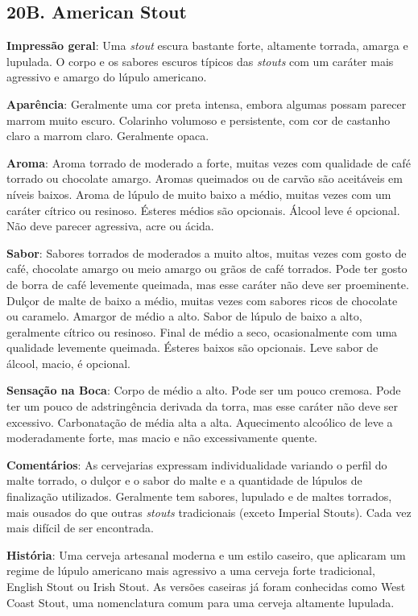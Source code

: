 \subsection*{20B. American Stout}

\textbf{Impressão geral}: Uma \textit{stout} escura bastante forte, altamente torrada, amarga e lupulada. O corpo e os sabores escuros típicos das \textit{stouts} com um caráter mais agressivo e amargo do lúpulo americano.

\textbf{Aparência}: Geralmente uma cor preta intensa, embora algumas possam parecer marrom muito escuro. Colarinho volumoso e persistente, com cor de castanho claro a marrom claro. Geralmente opaca.

\textbf{Aroma}: Aroma torrado de moderado a forte, muitas vezes com qualidade de café torrado ou chocolate amargo. Aromas queimados ou de carvão são aceitáveis em níveis baixos. Aroma de lúpulo de muito baixo a médio, muitas vezes com um caráter cítrico ou resinoso. Ésteres médios são opcionais. Álcool leve é opcional. Não deve parecer agressiva, acre ou ácida.

\textbf{Sabor}: Sabores torrados de moderados a muito altos, muitas vezes com gosto de café, chocolate amargo ou meio amargo ou grãos de café torrados. Pode ter gosto de borra de café levemente queimada, mas esse caráter não deve ser proeminente. Dulçor de malte de baixo a médio, muitas vezes com sabores ricos de chocolate ou caramelo. Amargor de médio a alto. Sabor de lúpulo de baixo a alto, geralmente cítrico ou resinoso. Final de médio a seco, ocasionalmente com uma qualidade levemente queimada. Ésteres baixos são opcionais. Leve sabor de álcool, macio, é opcional.

\textbf{Sensação na Boca}: Corpo de médio a alto. Pode ser um pouco cremosa. Pode ter um pouco de adstringência derivada da torra, mas esse caráter não deve ser excessivo. Carbonatação de média alta a alta. Aquecimento alcoólico de leve a moderadamente forte, mas macio e não excessivamente quente.

\textbf{Comentários}: As cervejarias expressam individualidade variando o perfil do malte torrado, o dulçor e o sabor do malte e a quantidade de lúpulos de finalização utilizados. Geralmente tem sabores, lupulado e de maltes torrados, mais ousados do que outras \textit{stouts} tradicionais (exceto Imperial Stouts). Cada vez mais difícil de ser encontrada.

\textbf{História}: Uma cerveja artesanal moderna e um estilo caseiro, que aplicaram um regime de lúpulo americano mais agressivo a uma cerveja forte tradicional, English Stout ou Irish Stout. As versões caseiras já foram conhecidas como West Coast Stout, uma nomenclatura comum para uma cerveja altamente lupulada.

